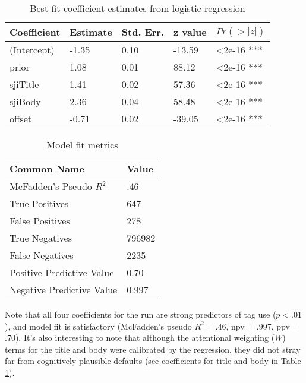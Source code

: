 \documentclass[10pt,letterpaper]{article}
\begin{document}
\renewcommand{\arraystretch}{1}
\renewcommand{\tabcolsep}{1mm}
\begin{table}[!ht]
  \begin{center}
    \caption{Best-fit coefficient estimates from logistic regression}
    \label{tab:coeffs}
    \vskip 0.12in
    \begin{tabular}{lllll}
      \hline
      Coefficient & 	Estimate &	Std. Err. &	z value &	$Pr(>|z|)$  \\
      \hline
      (Intercept) &	-1.35 &		0.10 &		-13.59 &	\textless2e-16 *** \\
      prior &		1.08 & 		0.01 &		88.12 & 	\textless2e-16 *** \\
      sjiTitle &	1.41 &		0.02 &		57.36 &		\textless2e-16 *** \\
      sjiBody &		2.36 &		0.04 &		58.48 &		\textless2e-16 *** \\
      offset &		-0.71 &		0.02 &		-39.05 &	\textless2e-16 *** \\
      \hline
    \end{tabular}
  \end{center}
\end{table}

\vspace{-2em}

\renewcommand{\arraystretch}{1}
\renewcommand{\tabcolsep}{3mm}
\begin{table}[!ht]
  \begin{center}
    \caption{Model fit metrics}
    \label{tab:fits}
    \vskip 0.12in
    \begin{tabular}{ll}
      \hline
      Common Name &  Value	\\
      \hline
      McFadden's Pseudo $R_{}^{2}$ &	.46 \\
      True Positives &			647 \\
      False Positives &			278 \\
      True Negatives &			\num{796982} \\
      False Negatives &			\num{2235} \\
      Positive Predictive Value &	0.70 \\
      Negative Predictive Value &	0.997 \\
      \hline
    \end{tabular}
  \end{center}
\end{table}

Note that all four coefficients for the run are strong predictors of tag use ($p<.01$), and model fit is satisfactory (McFadden's pseudo $R_{}^{2}=.46$, npv = .997, ppv = .70).
It's also interesting to note that although the attentional weighting ($W$) terms for the title and body were calibrated by the regression, they did not stray far from cognitively-plausible defaults
(see coefficients for title and body in Table \ref{tab:coeffs}).
\end{document}
